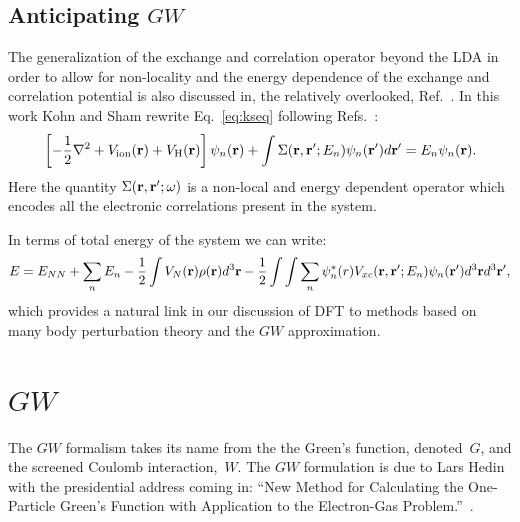 \subsection{Anticipating $GW$}
\cite{kohnshamII}
The generalization of the exchange and correlation operator beyond the LDA 
in order to allow for non-locality and the energy dependence of the exchange and
correlation potential is also discussed in, the relatively overlooked, Ref.~\cite{shamkohn66}. 
In this work Kohn and Sham rewrite Eq.~\ref{eq:kseq} following Refs.~\cite{schwinger51, hedin65}:
%
\begin{equation}
\label{eq:qpeq}
\left[-\frac{1}{2}\nabla^{2} + V_{\rm{ion}}({\bf r}) + V_{\rm{H}}({\bf r})\right]\psi_{n}({\bf r}) + \int \Sigma({\bf r},{\bf r}';E_{n})\psi_{n}({\bf r}') d{\bf r}' = E_{n}\psi_{n}({\bf r}).
\end{equation}
%
Here the quantity $\Sigma({\bf r},{\bf r}';\omega)$ is a non-local and energy dependent
operator which encodes all the electronic correlations present in the system. 

In terms of total energy of the system we can write:
%
\begin{equation}
\label{eq:shamschlut}
E = E_{NN} + \sum_{n} E_{n} - \frac{1}{2}\int V_{N}({\bf r})\rho({\bf r})d^{3}{\bf r}
-\frac{1}{2}\int\int\sum_{n} \psi_{n}^{*}(r)V_{xc}({\bf r},{\bf r}';E_{n})\psi_{n}({\bf r}')d^{3}{\bf r} d^{3}{\bf r}',
\end{equation}
%
which provides a natural link in our discussion of DFT to methods
based on many body perturbation theory \cite{shamschlut83} and the $GW$
approximation.


\section{$GW$}
The $GW$ formalism takes its name from the the Green's function, denoted~$G$, and the 
screened Coulomb interaction,~$W$\cite{hedin65}. The $GW$ formulation is due
to Lars Hedin with the presidential address coming in:
``New Method for Calculating the One-Particle Green's Function
with Application to the Electron-Gas Problem.''~\cite{hedin65}. 

